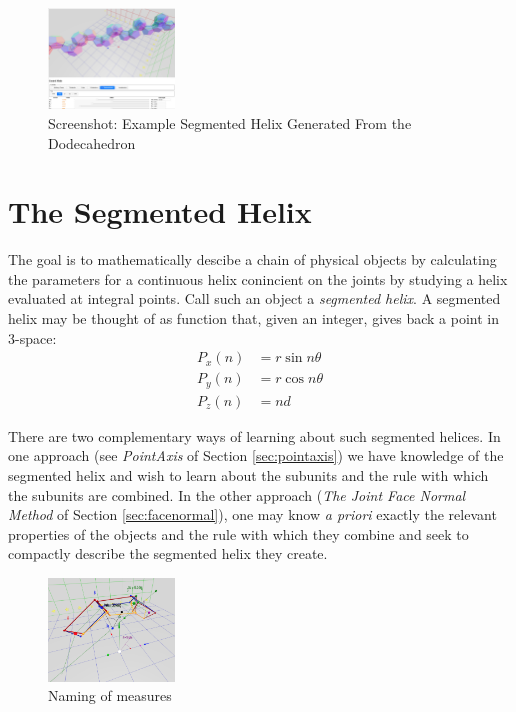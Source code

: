 \documentclass{svproc}
\begin{document}
\begin{figure}
     \centering
     \includegraphics[width=0.30\textwidth]{figures/Dodecahedral.png}
     \caption{Screenshot: Example Segmented Helix Generated From the Dodecahedron}
  \label{fig:dodecahedron}
\end{figure}

\section{The Segmented Helix}

The goal is to mathematically descibe a chain of physical objects by
calculating
the parameters for a continuous helix conincient on the joints by studying
a helix evaluated at integral points. Call such an object a {\em segmented helix}.
A segmented helix may be thought of as function that, given an integer, gives back a point in
3-space:
\begin{align}
    P_x(n) &= r \sin{n \theta}  \\
    P_y(n) &= r \cos{n \theta} \\
   P_z(n) &= n d
\end{align}

There are two complementary ways of learning about such segmented helices.
In one approach (see {\em PointAxis} of Section \ref{sec:pointaxis})
we have knowledge of the segmented helix and
wish to learn about the subunits and the rule with which the subunits are combined.
In the other approach ({\em The Joint Face Normal Method} of Section \ref{sec:facenormal}),
one may know {\it a priori} exactly the
relevant properties of the objects and the rule with which they combine
and seek to compactly describe the segmented helix they create.


\begin{figure}
     \centering
     \includegraphics[width=0.30\textwidth]{figures/ABCDFigure.png}
     \caption{Naming of measures}
  \label{fig:naming}
\end{figure}
\end{document}
